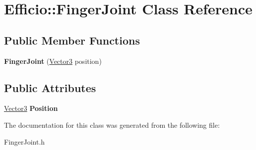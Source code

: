 \hypertarget{class_efficio_1_1_finger_joint}{}\section{Efficio\+:\+:Finger\+Joint Class Reference}
\label{class_efficio_1_1_finger_joint}
\subsection*{Public Member Functions}
\begin{DoxyCompactItemize}
\item 
{\bfseries Finger\+Joint} (\hyperlink{class_efficio_1_1_vector3}{Vector3} position)\hypertarget{class_efficio_1_1_finger_joint_a8200eff889e8f1e57304986393d61c35}{}\label{class_efficio_1_1_finger_joint_a8200eff889e8f1e57304986393d61c35}

\end{DoxyCompactItemize}
\subsection*{Public Attributes}
\begin{DoxyCompactItemize}
\item 
\hyperlink{class_efficio_1_1_vector3}{Vector3} {\bfseries Position}\hypertarget{class_efficio_1_1_finger_joint_a8a0ae42e54b38ab49019330560c881c1}{}\label{class_efficio_1_1_finger_joint_a8a0ae42e54b38ab49019330560c881c1}

\end{DoxyCompactItemize}


The documentation for this class was generated from the following file\+:\begin{DoxyCompactItemize}
\item 
Finger\+Joint.\+h\end{DoxyCompactItemize}
